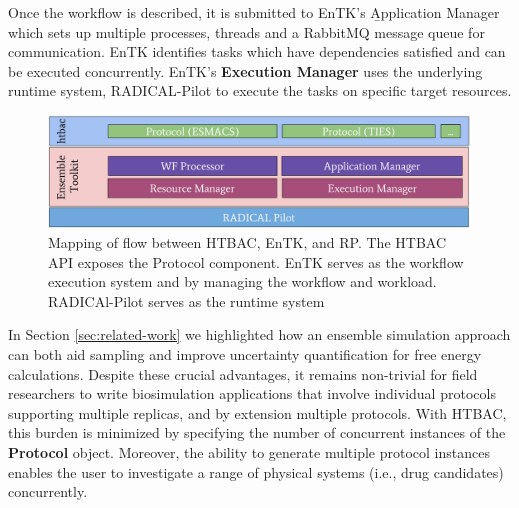 



Once the workflow is described, it is submitted to EnTK's
\b{Application Manager} which sets up multiple processes, threads and a
RabbitMQ message queue for communication.
EnTK identifies tasks which have dependencies satisfied and can be executed
concurrently. EnTK's \textbf{Execution Manager} uses the underlying runtime
system, RADICAL-Pilot to execute the tasks on specific target resources.

\begin{figure}
  \centering
   \includegraphics[width=\columnwidth]{figures/isc_htbac_integration_with_entk_RP-4.pdf}
  \caption{Mapping of flow between HTBAC, EnTK, and RP. The HTBAC API exposes the Protocol
  component. EnTK serves as the workflow execution system and
  by managing the workflow and workload. RADICAl-Pilot serves as the runtime system}
\label{fig:integration}
\end{figure}





	In Section \ref{sec:related-work} we highlighted how an ensemble
simulation approach can both aid sampling and improve uncertainty
quantification for free energy calculations. Despite these crucial advantages,
it remains non-trivial for field researchers to write biosimulation
applications that involve individual protocols supporting multiple replicas,
and by extension multiple protocols. With HTBAC, this burden is minimized by
specifying the number of concurrent instances of the \textbf{Protocol} object.
Moreover, the ability to generate multiple protocol instances enables the user
to investigate a range of physical systems (i.e., drug candidates)
concurrently.

